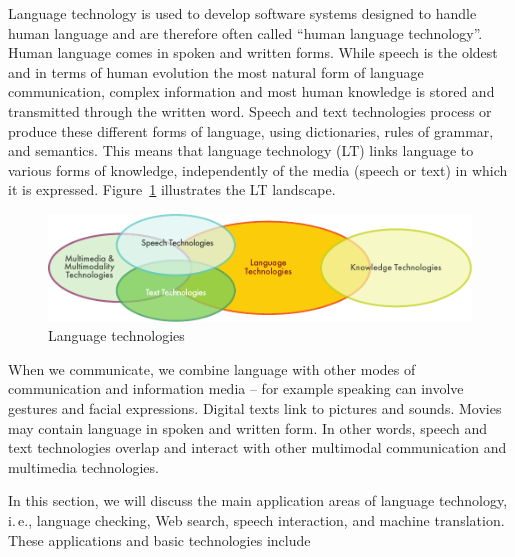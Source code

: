 {\clearpage



\begin{multicols}{2}  

Language technology is used to develop software systems designed to handle human language and are therefore often called “human language technology”. Human language comes in spoken and written forms. While speech is the oldest and in terms of human evolution the most natural form of language communication, complex information and most human knowledge is stored and transmitted through the written word. Speech and text technologies process or produce these different forms of language, using dictionaries, rules of grammar, and semantics. This means that language technology (LT) links language to various forms of knowledge, independently of the media (speech or text) in which it is expressed. Figure~\ref{fig:ltincontext_en} illustrates the LT landscape.

\begin{figure}[htb]
  \center
  \includegraphics[width=\textwidth]{../_media/english/language_technologies}
  \caption{Language technologies}
  \label{fig:ltincontext_en}
\end{figure}

When we communicate, we combine language with other modes of communication and information media – for example speaking can involve gestures and facial expressions. Digital texts link to pictures and sounds. Movies may contain language in spoken and written form. In other words, speech and text technologies overlap and interact with other multimodal communication and multimedia technologies.

In this section, we will discuss the main application areas of language technology, i.\,e., language checking, Web search, speech interaction, and machine translation. These applications and basic technologies include 


\end{multicols}}
